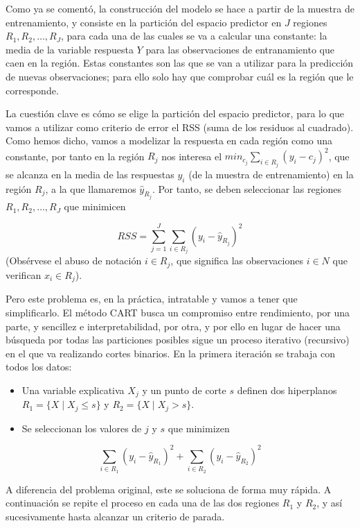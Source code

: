 \documentclass[
]{book}
\theoremstyle{break}
\theoremstyle{nonumberplain}
\begin{document}
Como ya se comentó, la construcción del modelo se hace a partir de la muestra de entrenamiento, y
consiste en la partición del espacio predictor en \(J\) regiones
\(R_1, R_2, \ldots, R_J\), para cada una de las cuales se va a calcular una constante:
la media de la variable respuesta \(Y\) para las observaciones de entranamiento que
caen en la región. Estas constantes son las que se van a utilizar para
la predicción de nuevas observaciones; para ello solo hay que comprobar cuál es
la región que le corresponde.

La cuestión clave es cómo se elige la partición del espacio predictor, para lo
que vamos a utilizar como criterio de error el RSS (suma de los residuos al cuadrado).
Como hemos dicho, vamos a modelizar la respuesta en cada región como una constante,
por tanto en la región \(R_j\) nos interesa el
\(min_{c_j} \sum_{i\in R_j} (y_i - c_j)^2\), que se alcanza en la media de las
respuestas \(y_i\) (de la muestra de entrenamiento) en la región \(R_j\),
a la que llamaremos \(\widehat y_{R_j}\).
Por tanto, se deben seleccionar las regiones \(R_1, R_2, \ldots, R_J\) que minimicen

\[RSS = \sum_{j=1}^{J} \sum_{i\in R_j} (y_i - \widehat y_{R_j})^2\]
(Obsérvese el abuso de notación \(i\in R_j\), que significa las observaciones
\(i\in N\) que verifican \(x_i \in R_j\)).

Pero este problema es, en la práctica, intratable y vamos a tener que simplificarlo.
El método CART busca un compromiso
entre rendimiento, por una parte, y sencillez e interpretabilidad, por otra, y por ello
en lugar de hacer una búsqueda por todas las particiones posibles sigue un proceso
iterativo (recursivo) en el que va realizando cortes binarios. En la primera iteración
se trabaja con todos los datos:

\begin{itemize}
\item
  Una variable explicativa \(X_j\) y un punto de corte \(s\) definen dos hiperplanos
  \(R_1 = \{ X \mid X_j \le s \}\) y \(R_2 = \{ X \mid X_j > s \}\).
\item
  Se seleccionan los valores de \(j\) y \(s\) que minimizen
\end{itemize}

\[ \sum_{i\in R_1} (y_i - \widehat y_{R_1})^2 + \sum_{i\in R_2} (y_i - \widehat y_{R_2})^2\]

A diferencia del problema original, este se soluciona de forma muy rápida. A continuación
se repite el proceso en cada una de las dos regiones \(R_1\) y \(R_2\), y así sucesivamente
hasta alcanzar un criterio de parada.
\end{document}
